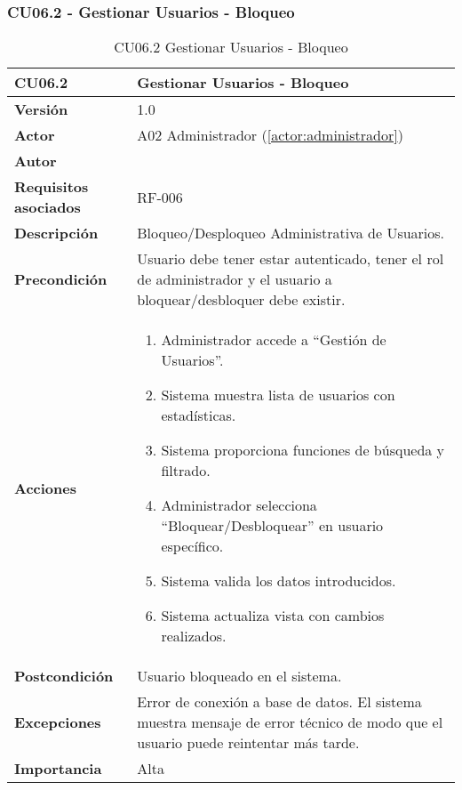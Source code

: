 \subsubsection{CU06.2 - Gestionar Usuarios - Bloqueo}

\begin{table}[H]
	\centering
	\begin{tabularx}{\linewidth}{ p{} p{} }
		\toprule
		\textbf{CU06.2}    & \textbf{Gestionar Usuarios - Bloqueo} \\
		\toprule
		\textbf{Versión}              & 1.0    \\
		\textbf{Actor}                & A02 Administrador (\ref{actor:administrador}) \\
		\textbf{Autor}                & \nombre \\
		\textbf{Requisitos asociados} & RF-006 \\
		\textbf{Descripción}          & Bloqueo/Desploqueo Administrativa de Usuarios. \\
		\textbf{Precondición}         & Usuario debe tener estar autenticado, tener el rol de administrador y el usuario a bloquear/desbloquer debe existir. \\
		\textbf{Acciones}             &
		\begin{enumerate}
			\def\labelenumi{\arabic{enumi}.}
			\tightlist
			\item Administrador accede a ``Gestión de Usuarios''.
            \item Sistema muestra lista de usuarios con estadísticas.
            \item Sistema proporciona funciones de búsqueda y filtrado.
            \item Administrador selecciona ``Bloquear/Desbloquear'' en usuario específico.
            \item Sistema valida los datos introducidos.
            \item Sistema actualiza vista con cambios realizados.
		\end{enumerate}\\
		\textbf{Postcondición}        & Usuario bloqueado en el sistema.\\
		\textbf{Excepciones}          & Error de conexión a base de datos. El sistema muestra mensaje de error técnico de modo que el usuario puede reintentar más tarde.\\
		\textbf{Importancia}          & Alta \\
		\bottomrule
	\end{tabularx}
	\caption{CU06.2 Gestionar Usuarios - Bloqueo}
	\label{cu:gestionar-usuarios-bloqueo}
\end{table}

